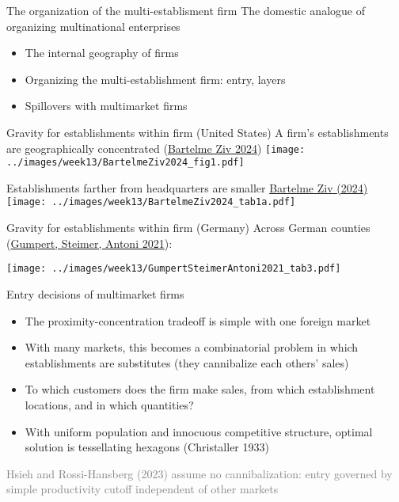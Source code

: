 \documentclass[11pt,notes=hide,aspectratio=169]{beamer}
\begin{document}
\begin{frame}{The organization of the multi-establisment firm}
The domestic analogue of organizing multinational enterprises
\begin{itemize}
\item The internal geography of firms
\item Organizing the multi-establishment firm: entry, layers
\item Spillovers with multimarket firms
\end{itemize}
\end{frame}
\begin{frame}{Gravity for establishments within firm (United States)}
A firm's establishments are geographically concentrated (\href{https://doi.org/10.1016/j.jinteco.2024.103889}{Bartelme Ziv 2024})
\texttt{[image: ../images/week13/BartelmeZiv2024\_fig1.pdf]}
\end{frame}
\begin{frame}{Establishments farther from headquarters are smaller}
\href{https://doi.org/10.1016/j.jinteco.2024.103889}{Bartelme Ziv (2024)}
\texttt{[image: ../images/week13/BartelmeZiv2024\_tab1a.pdf]}
\end{frame}
\begin{frame}{Gravity for establishments within firm (Germany)}
Across German counties (\href{https://doi.org/10.1093/qje/qjab049}{Gumpert, Steimer, Antoni 2021}):
\begin{center}
\texttt{[image: ../images/week13/GumpertSteimerAntoni2021\_tab3.pdf]}
\end{center}
\end{frame}
\begin{frame}{Entry decisions of multimarket firms}
\begin{itemize}
\item The proximity-concentration tradeoff is simple with one foreign market
\item With many markets, this becomes a combinatorial problem in which establishments are substitutes
(they cannibalize each others' sales)
\item To which customers does the firm make sales, from which establishment locations, and in which quantities?
\item With uniform population and innocuous competitive structure,
optimal solution is tessellating hexagons (Christaller 1933)
\end{itemize}
\textcolor{gray}{Hsieh and Rossi-Hansberg (2023)
assume no cannibalization: entry governed by simple productivity cutoff independent of other markets}
\end{frame}
\end{document}
